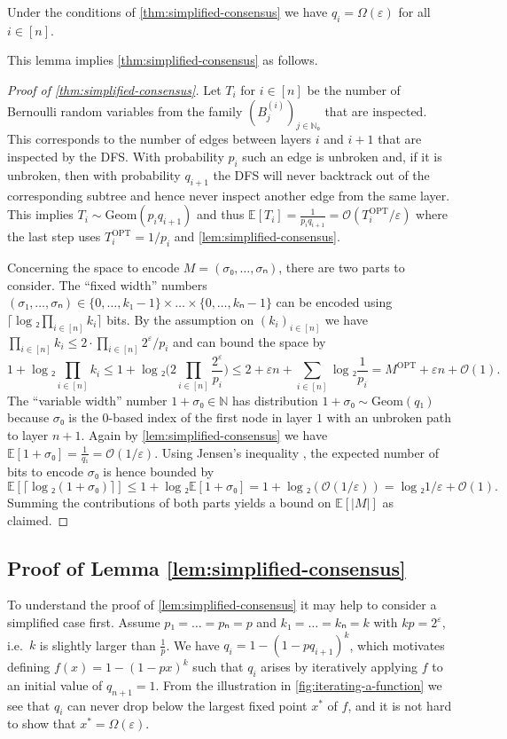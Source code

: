 \documentclass[cleveref,thm-restate]{lipics-v2021}
\def\Geom{\mathrm{Geom}}
\def\OPT{\mathrm{OPT}}
\begin{document}
\begin{lemma}
    \label{lem:simplified-consensus}
    Under the conditions of \cref{thm:simplified-consensus} we have $q_i = Ω(ε)$ for all $i ∈ [n]$.
\end{lemma}
This lemma implies \cref{thm:simplified-consensus} as follows.

\begin{proof}[Proof of \cref{thm:simplified-consensus}]
    Let $T_i$ for $i ∈ [n]$ be the number of Bernoulli random variables from the family $(B_j^{(i)})_{j ∈ ℕ₀}$ that are inspected. This corresponds to the number of edges between layers $i$ and $i+1$ that are inspected by the DFS. With probability $p_i$ such an edge is unbroken and, if it is unbroken, then with probability $q_{i+1}$ the DFS will never backtrack out of the corresponding subtree and hence never inspect another edge from the same layer. This implies $T_i \sim \Geom(p_i q_{i+1})$ and thus $𝔼[T_i] = \frac{1}{p_i q_{i+1}} = 𝒪(T_i^\OPT/ε)$ where the last step uses $T_i^\OPT = 1/p_i$ and \cref{lem:simplified-consensus}.
    
    Concerning the space to encode $M = (σ₀,…,σₙ)$, there are two parts to consider. The “fixed width” numbers $(σ₁,…,σₙ) ∈ \{0,…,k₁-1\} × … × \{0,…,kₙ-1\}$ can be encoded using $⌈\log₂ \prod_{i ∈ [n]} k_i⌉$ bits.
    By the assumption on $(k_i)_{i ∈ [n]}$ we have $\prod_{i ∈ [n]} k_i ≤ 2·\prod_{i ∈ [n]} 2^{ε}/p_i$ and can bound the space by
    \[
          1+ \log₂ \prod_{i ∈ [n]} k_i
        ≤ 1+ \log₂ \Big(2 \prod_{i ∈ [n]} \frac{2^ε}{p_i}\Big)
        ≤ 2 + εn + \sum_{i ∈ [n]} \log₂ \frac{1}{p_i} = M^\OPT + εn + 𝒪(1).
    \]
    The “variable width” number $1+σ₀ ∈ ℕ$ has distribution $1+σ₀ \sim \Geom(q₁)$ because $σ₀$ is the $0$-based index of the first node in layer $1$ with an unbroken path to layer $n+1$. Again by \cref{lem:simplified-consensus} we have $𝔼[1+σ₀] = \frac{1}{q₁} = 𝒪(1/ε)$. Using Jensen's inequality \cite{jensen1906fonctions}, the expected number of bits to encode $σ₀$ is hence bounded by
    \[ 𝔼[⌈\log₂(1+σ₀)⌉] ≤ 1 + \log₂ 𝔼[1+σ₀] = 1 + \log₂(𝒪(1/ε)) = \log₂ 1/ε + 𝒪(1). \]
    Summing the contributions of both parts yields a bound on $𝔼[|M|]$ as claimed.
\end{proof}

\subsection{Proof of Lemma \ref{lem:simplified-consensus}}

To understand the proof of \cref{lem:simplified-consensus} it may help to consider a simplified case first.
Assume $p₁ = … = pₙ = p$ and $k₁ = … = kₙ = k$ with $kp = 2^ε$, i.e.\ $k$ is slightly larger than $\frac{1}{p}$. We have $q_i = 1-(1-pq_{i+1})^k$, which motivates defining $f(x) = 1-(1-px)^k$ such that $q_i$ arises by iteratively applying $f$ to an initial value of $q_{n+1} = 1$.
From the illustration in \cref{fig:iterating-a-function} we see that $q_i$ can never drop below the largest fixed point $x^*$ of $f$, and it is not hard to show that $x^* = Ω(ε)$.
\end{document}
